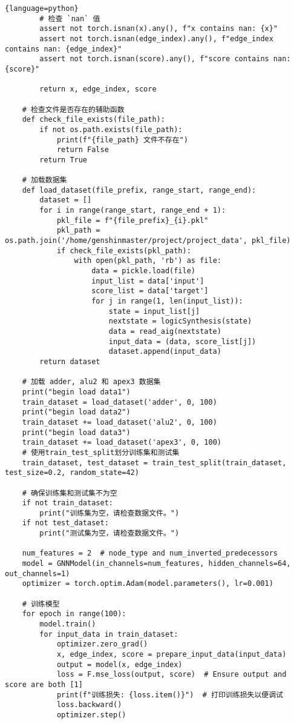 \documentclass[UTF8]{ctexart}
\begin{document}
\begin{lstlisting}{language=python}
        # 检查 `nan` 值
        assert not torch.isnan(x).any(), f"x contains nan: {x}"
        assert not torch.isnan(edge_index).any(), f"edge_index contains nan: {edge_index}"
        assert not torch.isnan(score).any(), f"score contains nan: {score}"
        
        return x, edge_index, score
    
    # 检查文件是否存在的辅助函数
    def check_file_exists(file_path):
        if not os.path.exists(file_path):
            print(f"{file_path} 文件不存在")
            return False
        return True
    
    # 加载数据集
    def load_dataset(file_prefix, range_start, range_end):
        dataset = []
        for i in range(range_start, range_end + 1):
            pkl_file = f"{file_prefix}_{i}.pkl"
            pkl_path = os.path.join('/home/genshinmaster/project/project_data', pkl_file)
            if check_file_exists(pkl_path):
                with open(pkl_path, 'rb') as file:
                    data = pickle.load(file)
                    input_list = data['input']
                    score_list = data['target']
                    for j in range(1, len(input_list)):
                        state = input_list[j]
                        nextstate = logicSynthesis(state)
                        data = read_aig(nextstate)
                        input_data = (data, score_list[j])
                        dataset.append(input_data)
        return dataset
    
    # 加载 adder, alu2 和 apex3 数据集
    print("begin load data1")
    train_dataset = load_dataset('adder', 0, 100)
    print("begin load data2")
    train_dataset += load_dataset('alu2', 0, 100)
    print("begin load data3")
    train_dataset += load_dataset('apex3', 0, 100)
    # 使用train_test_split划分训练集和测试集
    train_dataset, test_dataset = train_test_split(train_dataset, test_size=0.2, random_state=42)
    
    # 确保训练集和测试集不为空
    if not train_dataset:
        print("训练集为空，请检查数据文件。")
    if not test_dataset:
        print("测试集为空，请检查数据文件。")
    
    num_features = 2  # node_type and num_inverted_predecessors
    model = GNNModel(in_channels=num_features, hidden_channels=64, out_channels=1)
    optimizer = torch.optim.Adam(model.parameters(), lr=0.001)
    
    # 训练模型
    for epoch in range(100):
        model.train()
        for input_data in train_dataset:
            optimizer.zero_grad()
            x, edge_index, score = prepare_input_data(input_data)
            output = model(x, edge_index)
            loss = F.mse_loss(output, score)  # Ensure output and score are both [1]
            print(f"训练损失: {loss.item()}")  # 打印训练损失以便调试
            loss.backward()
            optimizer.step()
    

\end{lstlisting}
\end{document}
